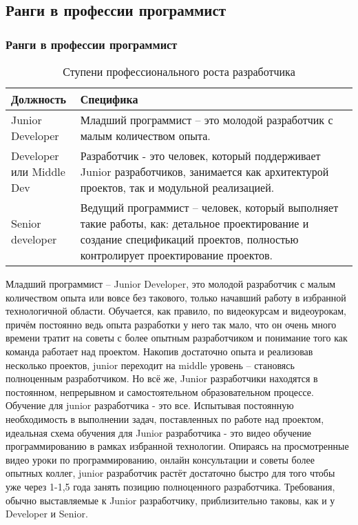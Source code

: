 \documentclass{../industrial-development}
\begin{document}
\subsection{Ранги в профессии программист}
\begin{frame} \frametitle{Ранги в профессии программист}

	 	\begin{table}[H]
\caption{\label{tab:canonsummary} Ступени профессионального роста разработчика}
\begin{center}
\begin{tabular}{|p{0.2\linewidth}|p{0.8\linewidth}|}
\hline
\textbf{Должность} & \textbf{Специфика} \\
\hline
Junior Developer &  Младший программист – это молодой разработчик с малым количеством опыта. \\
\hline
Developer или Middle Dev  & Разработчик -  это человек, который поддерживает Junior разработчиков, занимается как архитектурой проектов, так и модульной реализацией.   \\
\hline
Senior developer & Ведущий программист – человек, который выполняет такие работы, как: детальное проектирование и создание спецификаций проектов, полностью контролирует проектирование проектов. \\
\hline
\end{tabular}
\end{center}
\end{table} 
\end{frame}
\lecturenotes
Младший программист – Junior Developer, это молодой разработчик с малым количеством опыта или вовсе без такового, только начавший работу в избранной технологичной области. Обучается, как правило, по видеокурсам и видеоурокам, причём постоянно ведь опыта разработки у него так мало, что он очень много времени тратит на советы с более опытным разработчиком и понимание того как команда работает  над проектом. Накопив достаточно опыта и реализовав несколько проектов, junior переходит на middle уровень – становясь полноценным разработчиком. Но всё же, Junior разработчики находятся в постоянном, непрерывном и самостоятельном образовательном процессе. Обучение для junior разработчика -  это все. Испытывая постоянную необходимость в выполнении задач, поставленных по работе над проектом, идеальная схема обучения для Junior разработчика - это видео обучение программированию в рамках избранной технологии. Опираясь на просмотренные видео уроки по программированию, онлайн консультации и советы более опытных коллег, junior разработчик растёт достаточно быстро для того чтобы уже через 1-1,5 года занять позицию полноценного разработчика. Требования, обычно выставляемые к Junior разработчику, приблизительно таковы, как и у Developer и Senior.
\end{document}
